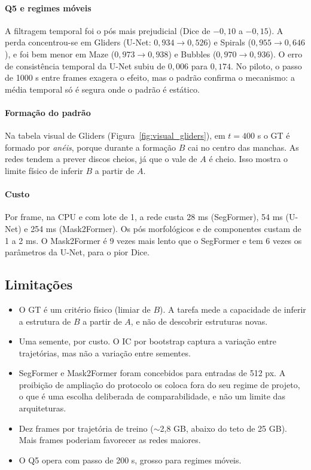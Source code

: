 \paragraph{Q5 e regimes móveis} A filtragem temporal foi o pós mais prejudicial (Dice de $-0{,}10$ a
$-0{,}15$). A perda concentrou-se em Gliders (U-Net: $0{,}934\to0{,}526$) e Spirals
($0{,}955\to0{,}646$), e foi bem menor em Maze ($0{,}973\to0{,}938$) e Bubbles
($0{,}970\to0{,}936$). O erro de consistência temporal da U-Net subiu de $0{,}006$ para $0{,}174$.
No piloto, o passo de 1000 s entre frames exagera o efeito, mas o padrão confirma o mecanismo: a
média temporal só é segura onde o padrão é estático.

\paragraph{Formação do padrão} Na tabela visual de Gliders (Figura~\ref{fig:visual_gliders}), em
$t=400$ s o GT é formado por \emph{anéis}, porque durante a formação $B$ cai no centro das manchas.
As redes tendem a prever discos cheios, já que o vale de $A$ é cheio. Isso mostra o limite físico
de inferir $B$ a partir de $A$.

\paragraph{Custo} Por frame, na CPU e com lote de 1, a rede custa 28 ms (SegFormer), 54 ms (U-Net) e
254 ms (Mask2Former). Os pós morfológicos e de componentes custam de 1 a 2 ms. O Mask2Former é 9
vezes mais lento que o SegFormer e tem 6 vezes os parâmetros da U-Net, para o pior Dice.

\subsection{Limitações}
\begin{itemize}
  \item O GT é um critério físico (limiar de $B$). A tarefa mede a capacidade de inferir a
    estrutura de $B$ a partir de $A$, e não de descobrir estruturas novas.
  \item Uma semente, por custo. O IC por bootstrap captura a variação entre trajetórias, mas não a
    variação entre sementes.
  \item SegFormer e Mask2Former foram concebidos para entradas de 512 px. A proibição de ampliação
    do protocolo os coloca fora do seu regime de projeto, o que é uma escolha deliberada de
    comparabilidade, e não um limite das arquiteturas.
  \item Dez frames por trajetória de treino ($\sim$2,8 GB, abaixo do teto de 25 GB). Mais frames
    poderiam favorecer as redes maiores.
  \item O Q5 opera com passo de 200 s, grosso para regimes móveis.
\end{itemize}
